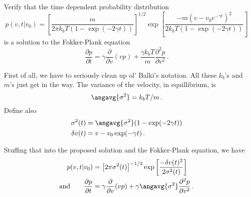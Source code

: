 

Verify that the time dependent probability distribution
\begin{equation*}
  p(v, t | v_0) = \left[
  \frac{m}{2 \pi k_b T (1 - \exp(-2 \gamma t))}
  \right]^{1/2}
  \exp \left[
    \frac{-m(v - v_0 e^{-\gamma t})^2}{2 k_b T (1 - \exp(-2 \gamma t))}
  \right]
\end{equation*}
is a solution to the Fokker-Plank equation
\begin{equation*}
  \frac{\partial p}{\partial t} = \gamma \frac{\partial}{\partial v} (v p) + \frac{\gamma k_b T}{m} \frac{\partial^2 p}{\partial v^2} \, .
\end{equation*}


First of all, we have to seriously clean up ol' Balki's notation.
All these $k_b$'s and $m$'s just get in the way.
The variance of the velocity, in equillibrium, is
\begin{equation*}
  \angavg{\sigma^2} = k_b T / m \, .
\end{equation*}
Define also
\begin{align*}
  \sigma^2(t) &= \angavg{\sigma^2} (1 - \exp(-2 \gamma t)) \\
  \delta v(t) &= v - v_0 \exp(-\gamma t)
  \, .
\end{align*}

Stuffing that into the proposed solution and the Fokker-Plank equation, we have
\begin{align*}
  p(v, t | v_0) &= \left[
    2 \pi \sigma^2(t)
  \right]^{-1/2}
  \exp \left[
    \frac{-\delta v(t)^2}{2 \sigma^2(t)}
  \right] \\
\text{and} \qquad \frac{\partial p}{\partial t} &= \gamma \frac{\partial}{\partial v} (v p) + \gamma \angavg{\sigma^2} \frac{\partial^2 p}{\partial v^2} \, .
\end{align*}

